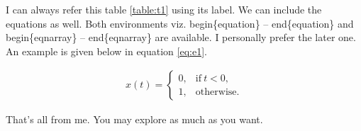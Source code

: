 \begin{table}[ht!]
	
\end{table}
 
I can always refer this table \ref{table:t1} using its label. We can include the equations as well. Both environments viz. begin\{equation\} -- end\{equation\} and begin\{eqnarray\} -- end\{eqnarray\} are available. I personally prefer the later one. An example is given below in equation \ref{eq:e1}.

\begin{eqnarray}
x(t) = \left\{
	\begin{array}{ll}
		0, & \mbox{if}\ t<0, \\
		1, & \mbox{otherwise.}
	\end{array}
\right.
\label{eq:e1}
\end{eqnarray}

That's all from me. You may explore as much as you want.